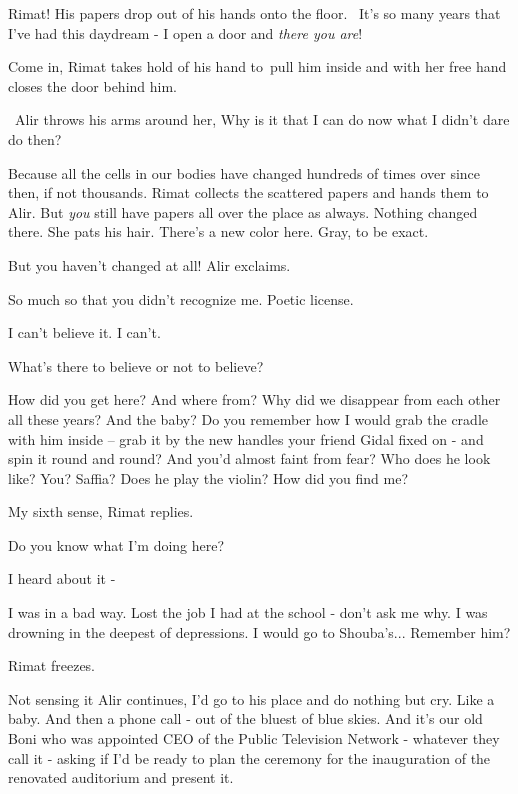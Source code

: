 \documentclass[12pt]{book}
\begin{document}
{\textquotedbl}Rimat!{\textquotedbl} His papers drop out of his hands onto the floor.~ {\textquotedbl}It's so many years
that I've had this daydream - I open a door and \textit{there you are}!{\textquotedbl}

{\textquotedbl}Come in,{\textquotedbl} Rimat takes hold of his hand to~pull him inside and with her free hand closes the
door behind him.

~Alir throws his arms around her, {\textquotedbl}Why is it that I can do now what I didn't dare do then?{\textquotedbl}

{\textquotedbl}Because all the cells in our bodies have changed hundreds of times over since then, if not
thousands.{\textquotedbl} Rimat collects the scattered papers and hands them to Alir. {\textquotedbl}But \textit{you}
still have papers all over the place as always. Nothing changed there.{\textquotedbl} She pats his hair.
{\textquotedbl}There's a new color here. Gray, to be exact.{\textquotedbl}

{\textquotedbl}But you haven't changed at all!{\textquotedbl} Alir exclaims.

{\textquotedbl}So much so that you didn't recognize me. Poetic license.{\textquotedbl}

{\textquotedbl}I can't believe it. I can't.{\textquotedbl}

{\textquotedbl}What's there to believe or not to believe?{\textquotedbl}

{\textquotedbl}How did you get here? And where from? Why did we disappear from each other all these years? And the baby?
Do you remember how I would grab the cradle with him inside -- grab it by the new handles your friend Gidal
fixed{ }on{ }{}- and
spin it round and round? And you'd almost faint from fear? Who does he look like? You? Saffia? Does he play the violin?
How did you find me?{\textquotedbl}

{\textquotedbl}My sixth sense,{\textquotedbl} Rimat replies.

{\textquotedbl}Do you know what I'm doing here?{\textquotedbl}

{\textquotedbl}I heard about it -{\textquotedbl}

{\textquotedbl}I was in a bad way. Lost the job I had at the school - don't ask me why. I was drowning in the deepest of
depressions. I would go to Shouba's... Remember him?{\textquotedbl}

Rimat freezes.

Not sensing it Alir continues, {\textquotedbl}I'd go to his place and do nothing but cry. Like a baby. And then a phone
call - out of the bluest of blue skies. And it's our old Boni who was appointed CEO of the Public Television Network -
whatever they call it - asking if I'd be ready to plan the ceremony for the inauguration of the renovated auditorium
and present it.{\textquotedbl}
\end{document}
